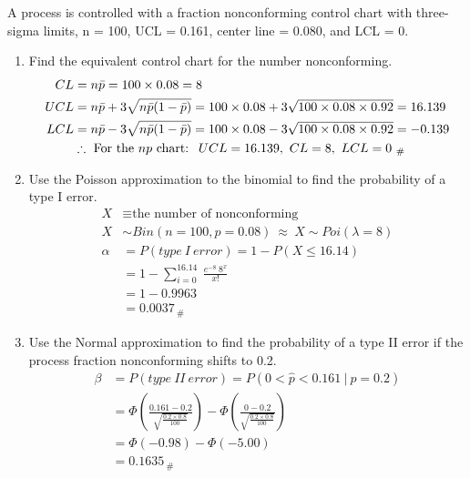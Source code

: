A process is controlled with a fraction nonconforming control chart with three-sigma limits, n = 100, UCL = 0.161, center line = 0.080, and LCL = 0.

\begin{enumerate}
    \item Find the equivalent control chart for the number nonconforming.
        \begin{align*}
            CL &= n\Bar{p} = 100 \times 0.08 = 8\\
            UCL &= n\Bar{p} + 3\sqrt{n\Bar{p}(1 - \Bar{p})} 
            = 100 \times 0.08 + 3\sqrt{100 \times 0.08 \times 0.92}
            = 16.139\\
            LCL &= n\Bar{p} - 3\sqrt{n\Bar{p}(1 - \Bar{p})} 
            = 100 \times 0.08 - 3\sqrt{100 \times 0.08 \times 0.92}
            = -0.139\\
            &\therefore \ \text{For the $np$ chart: } \ UCL = 16.139, \ CL = 8, \ LCL = 0_{\ \#}
        \end{align*}

    \item Use the Poisson approximation to the binomial to find the probability of a type I error.
        \begin{align*}
            X &\equiv \text{the number of nonconforming}\\
            X &\sim Bin(n = 100, p = 0.08) \ \approx \ X \sim Poi(\lambda = 8)\\
            \alpha &= P\left(type \ I \ error \right) = 1 - P\left(X \leq 16.14 \right)\\
            &= 1 - \sum_{i = 0}^{16.14} \ \frac{e^{-8} \ 8^x}{x!}\\
            &= 1 - 0.9963\\
            &= 0.0037_{\ \#}
        \end{align*}
        
    \item Use the Normal approximation to find the probability of a type II error if the process fraction nonconforming shifts to 0.2.
        \begin{align*}
            \beta &= P\left(type \ II \ error \right) = P\left(0 < \hat{p} < 0.161 \ | \ p = 0.2 \right)\\
            &= \Phi \left(\frac{0.161 - 0.2}{\sqrt{\frac{0.2 \times 0.8}{100}}} \right) - \Phi \left(\frac{0 - 0.2}{\sqrt{\frac{0.2 \times 0.8}{100}}} \right)\\
            &= \Phi(-0.98) - \Phi(-5.00)\\
            &= 0.1635_{\ \#}
        \end{align*}
        

\end{enumerate}
